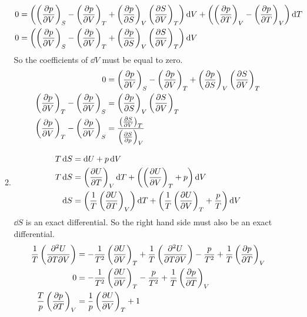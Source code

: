 \documentclass[10pt,\jkfside,a4paper]{article}
\begin{document}
\begin{enumerate}
\begin{enumerate}
\begin{equation}
\begin{split}
0 &= \left(\left(\pdv{p}{V}\right)_S - \left(\pdv{p}{V}\right)_T + \left(\pdv{p}{S}\right)_V\left(\pdv{S}{V}\right)_T\right)\dd{V} + \left(\left(\pdv{p}{T}\right)_V - \left(\pdv{p}{T}\right)_V\right)\dd{T} \\
0 &= \left(\left(\pdv{p}{V}\right)_S - \left(\pdv{p}{V}\right)_T + \left(\pdv{p}{S}\right)_V\left(\pdv{S}{V}\right)_T\right)\dd{V} \\
\end{split}
\end{equation}
So the coefficients of $\dd{V}$ must be equal to zero.
\begin{equation}
\begin{split}
0 &= \left(\pdv{p}{V}\right)_S - \left(\pdv{p}{V}\right)_T + \left(\pdv{p}{S}\right)_V\left(\pdv{S}{V}\right)_T \\
\left(\pdv{p}{V}\right)_T - \left(\pdv{p}{V}\right)_S &= \left(\pdv{p}{S}\right)_V\left(\pdv{S}{V}\right)_T \\
\left(\pdv{p}{V}\right)_T - \left(\pdv{p}{V}\right)_S &= \frac{\left(\pdv{S}{V}\right)_T}{\left(\pdv{S}{p}\right)_V} \\
\end{split}
\end{equation}

\item 

\begin{equation}
\begin{split}
T\dd{S} &= \dd{U} + p\dd{V} \\
T\dd{S} &= \left(\pdv{U}{T}\right)_V\dd{T} + \left(\left(\pdv{U}{V}\right)_T + p\right)\dd{V} \\
\dd{S} &= \left(\frac{1}{T}\left(\pdv{U}{T}\right)_V\right)\dd{T} + \left(\frac{1}{T}\left(\pdv{U}{V}\right)_T + \frac{p}{T}\right)\dd{V} \\
\end{split}
\end{equation}
$\dd{S}$ is an exact differential. So the right hand side must also be an exact differential.
\begin{equation}\label{hardpart}
\begin{split}
\frac{1}{T}\left(\pdv[2]{U}{T}{V}\right) &= -\frac{1}{T^2}\left(\pdv{U}{V}\right)_T + \frac{1}{T}\left(\pdv[2]{U}{T}{V}\right) - \frac{p}{T^2} + \frac{1}{T}\left(\pdv{p}{T}\right)_V \\
0 &= -\frac{1}{T^2}\left(\pdv{U}{V}\right)_T - \frac{p}{T^2} + \frac{1}{T}\left(\pdv{p}{T}\right)_V \\
\frac{T}{p}\left(\pdv{p}{T}\right)_V &= \frac{1}{p}\left(\pdv{U}{V}\right)_T + 1 \\
\end{split}
\end{equation}


\end{enumerate}
\end{enumerate}
\end{document}

